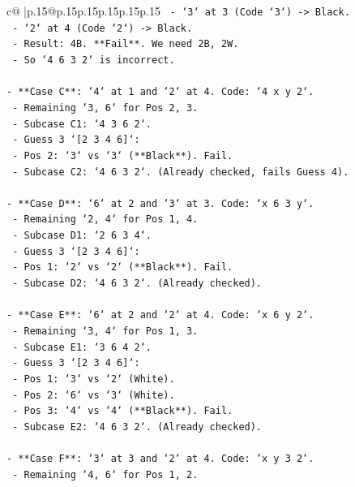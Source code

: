 \documentclass{article}
\begin{document}
{\begin{supertabular}{c@{$\;$}|p{.15\linewidth}@{}p{.15\linewidth}p{.15\linewidth}p{.15\linewidth}p{.15\linewidth}p{.15\linewidth}}
{{{\texttt{      {-} `3` at 3 (Code `3`) {-}> Black.} \\
\texttt{      {-} `2` at 4 (Code `2`) {-}> Black.} \\
\texttt{      {-} Result: 4B. **Fail**. We need 2B, 2W.} \\
\texttt{    {-} So `4 6 3 2` is incorrect.} \\
\\ 
\texttt{{-} **Case C**: `4` at 1 and `2` at 4. Code: `4 x y 2`.} \\
\texttt{  {-} Remaining `3, 6` for Pos 2, 3.} \\
\texttt{  {-} Subcase C1: `4 3 6 2`.} \\
\texttt{    {-} Guess 3 `{[}2 3 4 6{]}`:} \\
\texttt{      {-} Pos 2: `3` vs `3` (**Black**). Fail.} \\
\texttt{  {-} Subcase C2: `4 6 3 2`. (Already checked, fails Guess 4).} \\
\\ 
\texttt{{-} **Case D**: `6` at 2 and `3` at 3. Code: `x 6 3 y`.} \\
\texttt{  {-} Remaining `2, 4` for Pos 1, 4.} \\
\texttt{  {-} Subcase D1: `2 6 3 4`.} \\
\texttt{    {-} Guess 3 `{[}2 3 4 6{]}`:} \\
\texttt{      {-} Pos 1: `2` vs `2` (**Black**). Fail.} \\
\texttt{  {-} Subcase D2: `4 6 3 2`. (Already checked).} \\
\\ 
\texttt{{-} **Case E**: `6` at 2 and `2` at 4. Code: `x 6 y 2`.} \\
\texttt{  {-} Remaining `3, 4` for Pos 1, 3.} \\
\texttt{  {-} Subcase E1: `3 6 4 2`.} \\
\texttt{    {-} Guess 3 `{[}2 3 4 6{]}`:} \\
\texttt{      {-} Pos 1: `3` vs `2` (White).} \\
\texttt{      {-} Pos 2: `6` vs `3` (White).} \\
\texttt{      {-} Pos 3: `4` vs `4` (**Black**). Fail.} \\
\texttt{  {-} Subcase E2: `4 6 3 2`. (Already checked).} \\
\\ 
\texttt{{-} **Case F**: `3` at 3 and `2` at 4. Code: `x y 3 2`.} \\
\texttt{  {-} Remaining `4, 6` for Pos 1, 2.} \\
}}}
\end{supertabular}}
\end{document}
